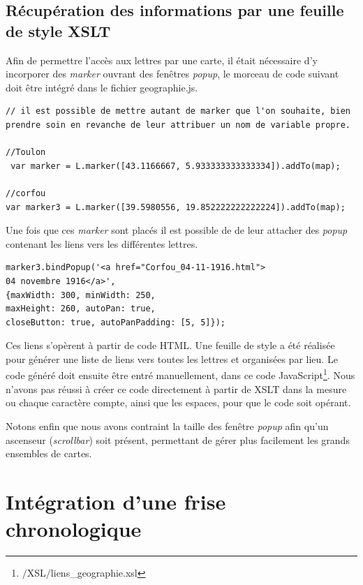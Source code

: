 \documentclass[12pt,a4paper]{book} %
\begin{document}
\subsection{Récupération des informations par une feuille de style XSLT}

Afin de permettre l'accès aux lettres par une carte, il était nécessaire d'y incorporer des \textit{marker} ouvrant des fenêtres \textit{popup}, le morceau de code suivant doit être intégré dans le fichier geographie.js.
\bigskip

\begin{lstlisting}
// il est possible de mettre autant de marker que l'on souhaite, bien prendre soin en revanche de leur attribuer un nom de variable propre.

//Toulon
 var marker = L.marker([43.1166667, 5.933333333333334]).addTo(map);

//corfou
var marker3 = L.marker([39.5980556, 19.852222222222224]).addTo(map);
\end{lstlisting}
\bigskip

Une fois que ces \textit{marker} sont placés il est possible de de leur attacher des \textit{popup} contenant les liens vers les différentes lettres.
\bigskip

\begin{verbatim}
marker3.bindPopup('<a href="Corfou_04-11-1916.html">
04 novembre 1916</a>',
{maxWidth: 300, minWidth: 250, 
maxHeight: 260, autoPan: true, 
closeButton: true, autoPanPadding: [5, 5]});
\end{verbatim}
\bigskip

Ces liens s'opèrent à partir de code HTML. Une feuille de style a été réalisée pour générer une liste de liens vers toutes les lettres et organisées par lieu. Le code généré doit ensuite être entré manuellement, dans ce code JavaScript\footnote{$/$XSL$/$liens\_geographie.xsl}. Nous n'avons pas réussi à créer ce code directement à partir de XSLT dans la mesure ou chaque caractère compte, ainsi que les espaces, pour que le code soit opérant.

Notons enfin que nous avons contraint la taille des fenêtre \textit{popup} afin qu'un ascenseur (\textit{scrollbar}) soit présent, permettant de gérer plus facilement les grands ensembles de cartes.


\section{Intégration d'une frise chronologique}
\end{document}
